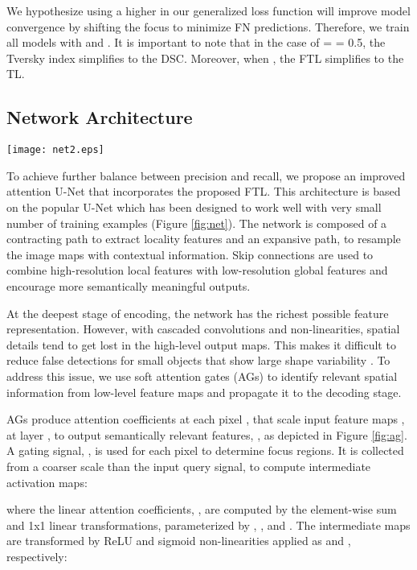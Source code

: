 \documentclass{article}
\begin{document}
We hypothesize using a higher  in our generalized loss function will improve model convergence by shifting the focus to minimize FN predictions. Therefore, we train all models with  and . It is important to note that in the case of  =  = 0.5, the Tversky index simplifies to the DSC. Moreover, when , the FTL simplifies to the TL.

\subsection{Network Architecture}

\begin{figure*}[h]
	\centering
	\texttt{[image: net2.eps]}
	\caption{Proposed Attention U-Net architecture with input image pyramid and deep supervised output layers. }
	\label{fig:net}
\end{figure*}

To achieve further balance between precision and recall, we propose an improved attention U-Net \cite{oktay} that incorporates the proposed FTL. This architecture is based on the popular U-Net which has been designed to work well with very small number of training examples (Figure \ref{fig:net}). The network is composed of a contracting path to extract locality features and an expansive path, to resample the image maps with contextual information. Skip connections are used to combine high-resolution local features with low-resolution global features and encourage more semantically meaningful outputs.

At the deepest stage of encoding, the network has the richest possible feature representation. However, with cascaded convolutions and non-linearities, spatial details tend to get lost in the high-level output maps. This makes it difficult to reduce false detections for small objects that show large shape variability \cite{oktay}. To address this issue, we use soft attention gates (AGs) to identify relevant spatial information from low-level feature maps and propagate it to the decoding stage.

AGs produce attention coefficients  at each pixel , that scale input feature maps , at layer , to output semantically relevant features,  , as depicted in Figure \ref{fig:ag}. A gating signal, , is used for each pixel  to determine focus regions. It is collected from a coarser scale than the input query signal,  to compute intermediate activation maps: 
 


where the linear attention coefficients, , are computed by the element-wise sum and 1x1 linear transformations, parameterized by , ,  and .  The intermediate maps are transformed by ReLU and sigmoid non-linearities applied as  and , respectively:  
\end{document}
